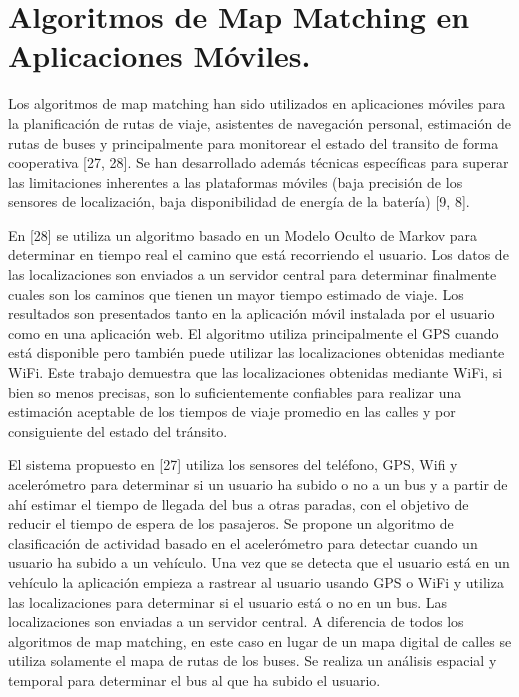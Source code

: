 \section{Algoritmos de Map Matching en Aplicaciones Móviles.}

Los algoritmos de map matching han sido utilizados en aplicaciones móviles para la planificación de rutas de viaje, asistentes de navegación personal, estimación de rutas de buses y principalmente para monitorear el estado del transito de forma cooperativa [27,  28]. Se han desarrollado además técnicas específicas para superar las limitaciones inherentes a las plataformas móviles (baja precisión de los sensores de localización, baja disponibilidad de energía de la batería) [9, 8].

En [28] se utiliza un algoritmo basado en un Modelo Oculto de Markov para determinar en tiempo real el camino que está recorriendo el usuario. Los datos de las localizaciones son enviados a un servidor central para determinar finalmente cuales son los caminos que tienen un mayor tiempo estimado de viaje. Los resultados son presentados tanto en la aplicación móvil instalada por el usuario como en una aplicación web. El algoritmo utiliza principalmente el GPS cuando está disponible pero también puede utilizar las localizaciones obtenidas mediante WiFi. Este trabajo demuestra que las localizaciones obtenidas mediante WiFi, si bien so menos precisas, son lo suficientemente confiables para realizar una estimación aceptable de los tiempos de viaje promedio en las calles y por consiguiente del estado del tránsito.

El sistema propuesto en [27] utiliza los sensores del teléfono, GPS, Wifi y acelerómetro para determinar si un usuario ha subido o no a un bus y a partir de ahí estimar el tiempo de llegada del bus a otras paradas, con el objetivo de reducir el tiempo de espera de los pasajeros. Se propone un algoritmo de clasificación de actividad basado en el acelerómetro para detectar cuando un usuario ha subido a un vehículo. Una vez que se detecta que el usuario está en un vehículo la aplicación empieza a rastrear al usuario usando GPS o WiFi y utiliza las localizaciones para determinar si el usuario está o no en un bus. Las localizaciones son enviadas a un servidor central. A diferencia de todos los algoritmos de map matching, en este caso en lugar de un mapa digital de calles se utiliza solamente el mapa de rutas de los buses. Se realiza un análisis espacial y temporal para determinar el bus al que ha subido el usuario.

